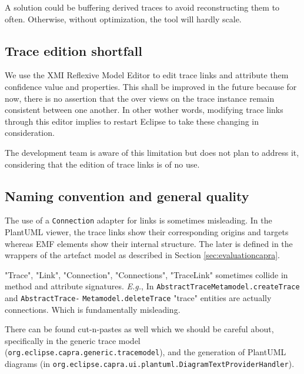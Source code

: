 A solution could be buffering derived traces to avoid reconstructing them to often. Otherwise, without optimization, the tool will hardly scale.

\subsection{Trace edition shortfall}
We use the XMI Reflexive Model Editor to edit trace links and attribute them confidence value and properties. This shall be improved in the future because for now, there is no assertion that the over views on the trace instance remain consistent between one another. In other wother words, modifying trace links through this editor implies to restart Eclipse to take these changing in consideration. 

The development team is aware of this limitation but does not plan to address it, considering that the edition of trace links is of no use.

\subsection{Naming convention and general quality}
The use of a \texttt{Connection} adapter for links is sometimes misleading. In the PlantUML viewer, the trace links show their corresponding origins and targets whereas EMF elements show their internal structure. The later is defined in the wrappers of the artefact model as described in Section \ref{sec:evaluationcapra}.  

"Trace", "Link", "Connection", "Connections", "TraceLink" sometimes collide in method and attribute signatures.  \textit{E.g.}, In \verb|AbstractTraceMetamodel.createTrace| and  \verb|AbstractTrace-| \verb|Metamodel.deleteTrace| "trace" entities are actually connections. Which is fundamentally misleading.

There can be found cut-n-pastes as well which we should be careful about, specifically in the generic trace model (\verb|org.eclipse.capra.generic.tracemodel|), and the generation of PlantUML diagrams (in \verb|org.eclipse.capra.ui.plantuml.DiagramTextProviderHandler|).









